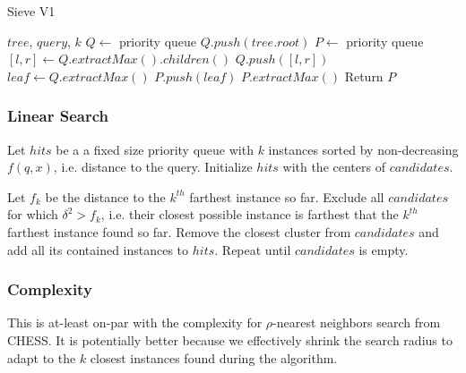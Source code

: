 \begin{algorithm} %
    \caption{Sieve V1} %
    \label{alg:sieve_v1} %
    \begin{algorithmic}[2] %
        \REQUIRE $tree$, $query$, $k$
        \STATE $Q \leftarrow$ priority queue
        \STATE $Q.push(tree.root)$
        \STATE $P \leftarrow$ priority queue
                \STATE $[l, r] \leftarrow Q.extractMax().children()$
                \STATE $Q.push([l, r])$
            \ENDWHILE
            \STATE $leaf \leftarrow Q.extractMax()$
            \STATE $P.push(leaf)$
                \STATE $P.extractMax()$
            \ENDWHILE
        \ENDWHILE
        \STATE Return $P$
    \end{algorithmic}
    \end{algorithm}

\subsubsection{Linear Search}
\label{subsubsec:methods:knn-search:leaf-search}

Let $hits$ be a a fixed size priority queue with $k$ instances sorted by non-decreasing $f(q, x)$, i.e. distance to the query.
Initialize $hits$ with the centers of $candidates$.

Let $f_k$ be the distance to the $k^{th}$ farthest instance so far.
Exclude all $candidates$ for which $\delta^2 > f_k$, i.e. their closest possible instance is farthest that the $k^{th}$ farthest instance found so far.
Remove the closest cluster from $candidates$ and add all its contained instances to $hits$.
Repeat until $candidates$ is empty.

\subsubsection{Complexity}
\label{subsubsec:methods:knn-search:complexity}

This is at-least on-par with the complexity for $\rho$-nearest neighbors search from CHESS.
It is potentially better because we effectively shrink the search radius to adapt to the $k$ closest instances found during the algorithm.

\label{subsubsec:methods:clustering:proof-of-eventually-decreasing-cluster-radii}

